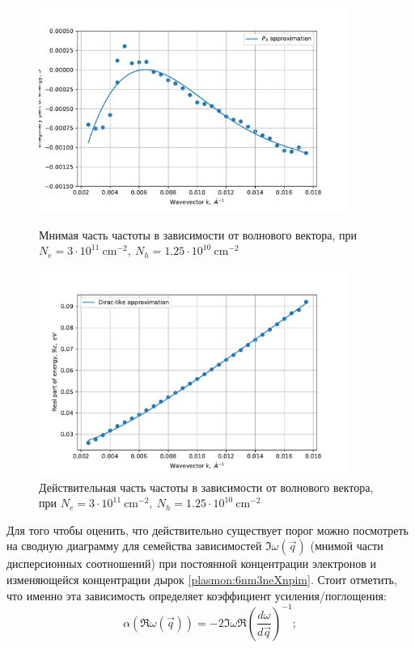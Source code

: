 \documentclass[../main.tex]{subfiles}
\begin{document}
    \begin{figure}[h]
        \begin{minipage}[h]{0.49\textwidth}
            \includegraphics[width=0.9\textwidth]{./images/plasmon_6nm_3_0125_im.pdf}
            \caption{Мнимая часть частоты в зависимости от волнового вектора, при $N_e = 3 \cdot 10^{11}~\text{cm}^{-2},~N_h = 1.25 \cdot 10^{10}~\text{cm}^{-2}$
            \label{plasmon:6nm3ne0125npim}}
        \end{minipage}
        \hfill
        \begin{minipage}[h]{0.49\textwidth}
            \includegraphics[width=0.9\textwidth]{./images/plasmon_6nm_3_0125_re.pdf}
            \caption{Действительная часть частоты в зависимости от волнового вектора, при $N_e = 3 \cdot 10^{11}~\text{cm}^{-2},~N_h = 1.25 \cdot 10^{10}~\text{cm}^{-2}$
            \label{plasmon:6nm3ne0125npre}}
        \end{minipage}
    \end{figure}

    Для того чтобы оценить, что действительно существует порог можно посмотреть на сводную диаграмму для семейства зависимостей $\Im \omega(\vec q)$
    (мнимой части дисперсионных соотношений) при постоянной концентрации электронов и изменяющейся концентрации дырок \ref{plasmon:6nm3neXnpim}.
    Стоит отметить, что именно эта зависимость определяет коэффициент усиления/поглощения:
    \begin{equation}
        \alpha(\Re \omega (\vec q)) = -2 \Im \omega \Re \left(\frac{d\omega}{d\vec q}\right)^{-1};
    \end{equation}
\end{document}
